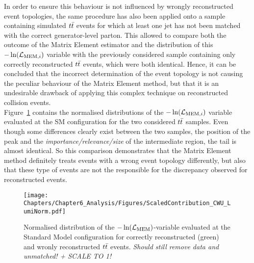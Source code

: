 In order to ensure this behaviour is not influenced by wrongly reconstructed event topologies, the same procedure has also been applied onto a sample containing simulated $t\bar{t}$ events for which at least one jet has not been matched with the correct generator-level parton.
This allowed to compare both the outcome of the Matrix Element estimator and the distribution of this $-\ln(\mathcal{L}_{\textrm{MEM}, i})$ variable with the previously considered sample containing only correctly reconstructed $t\bar{t}$ events, which were both identical.
Hence, it can be concluded that the incorrect determination of the event topology is not causing the peculiar behaviour of the Matrix Element method, but that it is an undesirable drawback of applying this complex technique on reconstructed collision events.
\\
Figure~\ref{fig::SMLikCorrVSWr} contains the normalised distributions of the $-\ln(\mathcal{L}_{\textrm{MEM}, i})$ variable evaluated at the SM configuration for the two considered $t\bar{t}$ samples.
Even though some differences clearly exist between the two samples, the position of the peak and the \textit{importance/relevance/size} of the intermediate region, the tail is almost identical.
So this comparison demonstrates that the Matrix Element method definitely treats events with a wrong event topology differently, but also that these type of events are not the responsible for the discrepancy observed for reconstructed events.
\\
\begin{figure}[h!t]
 \centering
 \texttt{[image: Chapters/Chapter6\_Analysis/Figures/ScaledContribution\_CWU\_LumiNorm.pdf]}
 \caption{Normalised distribution of the $-\ln(\mathcal{L}_{\textrm{MEM}})$-variable evaluated at the Standard Model configuration for correctly reconstructed (green) and wronly reconstructed $t\bar{t}$ events. \textit{Should still remove data and unmatched! + SCALE TO 1!}} \label{fig::SMLikCorrVSWr}
\end{figure}

